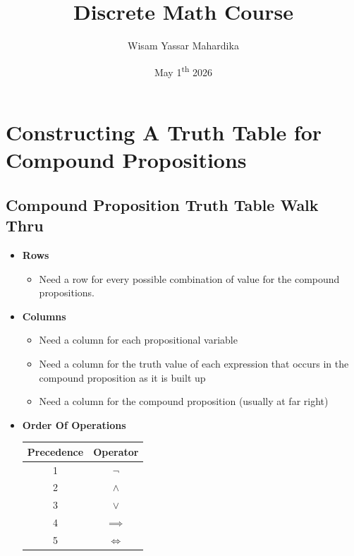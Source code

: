 \documentclass{article}
\title{Discrete Math Course}
\author{Wisam Yassar Mahardika}
\date{May 1\textsuperscript{th} 2026}
\begin{document}
\maketitle
\clearpage
\tableofcontents
\clearpage
\section{Constructing A Truth Table for Compound Propositions}
\subsection{Compound Proposition Truth Table Walk Thru}
\begin{itemize}
	\item \textbf{Rows}
		\begin{itemize}
			\item Need a row for every possible combination of value for the compound propositions.
		\end{itemize}
	\item \textbf{Columns}
		\begin{itemize}
			\item Need a column for each propositional variable
			\item Need a column for the truth value of each expression that occurs in the compound proposition as it is built up
			\item Need a column for the compound proposition (usually at far right)
		\end{itemize}		
	\item \textbf{Order Of Operations} \\
		\begin{tabular}{|c|c|}
			\hline
			Precedence & Operator\\
			\hline
			1 & $ \neg $ \\
			2 & $ \land $ \\
			3 & $ \lor $ \\
			4 & $ \implies $ \\
			5 & $ \Longleftrightarrow $ \\
			\hline
		\end{tabular}
\end{itemize}
\end{document}
